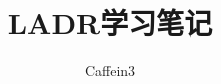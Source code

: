 \documentclass[b5paper]{memoir}
\begin{document}
\frontmatter
\title{LADR学习笔记}
\author{Caffein3}
\date{}
\maketitle
\tableofcontents

\mainmatter



\backmatter
\end{document}
